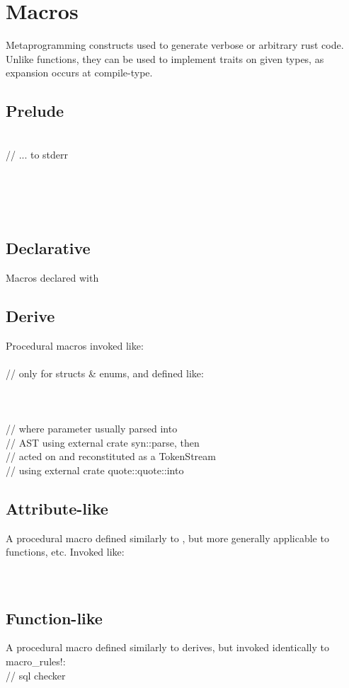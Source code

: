 \section{Macros}
Metaprogramming constructs used to generate verbose or arbitrary rust code.  Unlike functions, they can be used to implement traits on given types, as expansion occurs at compile-type. \\
\subsection*{Prelude}
 \\ 
 // ... to stderr \\
 \\
 \\
 \\
 \\
\subsection*{Declarative}
Macros declared with  \\
\subsection*{Derive}
Procedural macros invoked like: \\
 \\
// only for structs \& enums, and defined like: \\
 \\
 \\ 
 \\
// where parameter  usually parsed into \\ 
// AST using external crate syn::parse, then \\ 
// acted on and reconstituted as a TokenStream \\
// using external crate quote::quote::into  \\
\subsection*{Attribute-like}
A procedural macro defined similarly to , but more generally applicable to functions, etc.  Invoked like: \\
 \\
 \\
\subsection*{Function-like}
A procedural macro defined similarly to derives, but invoked identically to macro\_rules!: \\
 // sql checker \\
